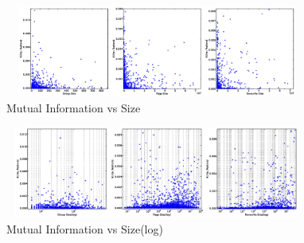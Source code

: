 \pagebreak


\begin{figure}
\centering
\includegraphics[width=100mm, height=30mm]{data/MIvsSize.eps}
\caption {Mutual Information vs Size}
\label {Fig: Mutual Information vs Size}
\end{figure}

\begin{figure}
\centering
\includegraphics[width=100mm, height=30mm]{data/MIvsSizelog.eps}
\caption{Mutual Information  vs Size(log)}
\label {Fig: Mutual Information vs Size(log)}
\end{figure}



